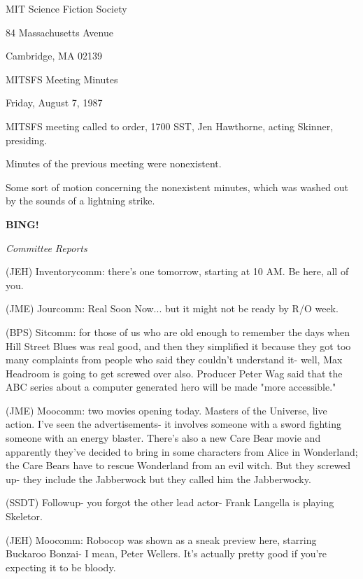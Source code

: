 \documentclass[12pt]{article}
\newcommand{\bing}{{\bf BING!} }
\newcommand{\goto}[1]{\bing \vskip 12pt \centerline{{\em{#1}}}}
\begin{document}
\begin{center}

MIT Science Fiction Society 

84 Massachusetts Avenue

Cambridge, MA 02139

\vspace{12pt}

MITSFS Meeting Minutes 

Friday, August 7, 1987

\end{center}
 
\vspace{18pt}

\setlength{\parskip}{6pt}

\noindent
MITSFS meeting called to order, 1700 SST, Jen Hawthorne, acting Skinner, presiding.

Minutes of the previous meeting were nonexistent.

Some sort of motion concerning the nonexistent minutes, which was washed out by the sounds of a lightning strike.

\goto{Committee Reports}

(JEH) Inventorycomm: there's one tomorrow, starting at 10 AM. Be here, all of you.

(JME) Jourcomm: Real Soon Now... but it might not be ready by R/O week.

(BPS) Sitcomm: for those of us who are old enough to remember the days when Hill Street Blues was real good, and then they simplified it because they got too many complaints from people who said they couldn't understand it- well, Max Headroom is going to get screwed over also. Producer Peter Wag said that the ABC series about a computer generated hero will be made "more accessible."

(JME) Moocomm: two movies opening today. Masters of the Universe, live action. I've seen the advertisements- it involves someone with a sword fighting someone with an energy blaster. There's also a new Care Bear movie and apparently they've decided to bring in some characters from Alice in Wonderland; the Care Bears have to rescue Wonderland from an evil witch. But they screwed up- they include the Jabberwock but they called him the Jabberwocky.

(SSDT) Followup- you forgot the other lead actor- Frank Langella is playing Skeletor.

(JEH) Moocomm: Robocop was shown as a sneak preview here, starring Buckaroo Bonzai- I mean, Peter Wellers. It's actually pretty good if you're expecting it to be bloody.
\end{document}
